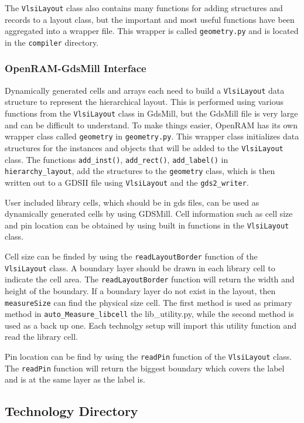 The \verb|VlsiLayout| class also contains many functions for adding
structures and records to a layout class, but the important and most
useful functions have been aggregated into a wrapper file.  This
wrapper is called \verb|geometry.py| and is located in the
\verb|compiler| directory.

\subsubsection{OpenRAM-GdsMill Interface}
\label{sec:wrapper}

Dynamically generated cells and arrays each need to build a
\verb|VlsiLayout| data structure to represent the hierarchical layout.
This is performed using various functions from the \verb|VlsiLayout|
class in GdsMill, but the GdsMill file is very large and can be
difficult to understand.  To make things easier, OpenRAM has its own
wrapper class called \verb|geometry| in \verb|geometry.py|.  This
wrapper class initializes data structures for the
instances and objects that will be added to the \verb|VlsiLayout|
class.  The functions \verb|add_inst()|, \verb|add_rect()|,
\verb|add_label()| in \verb|hierarchy_layout|, add the structures to
the \verb|geometry| class, which is then written out to a GDSII file
using \verb|VlsiLayout| and the \verb|gds2_writer|.

User included library cells, which should be in gds files, can be used
as dynamically generated cells by using GDSMill.
Cell information such as cell size and pin location can be obtained by using
built in functions in the \verb|VlsiLayout| class.

Cell size can be finded by using the \verb|readLayoutBorder| function of the \verb|VlsiLayout| class.
A boundary layer should be drawn in each library cell to indicate the cell area.
The \verb|readLayoutBorder| function will return the width and height of the boundary.
If a boundary layer do not exist in the layout, then \verb|measureSize| can find the physical 
size cell.
The first method is used as primary method in \verb|auto_Measure_libcell| the lib\_utility.py,
while the second method is used as a back up one.
Each technolgy setup will import this utility function and read the library cell.

Pin location can be find by using the \verb|readPin| function of the \verb|VlsiLayout| class.
The \verb|readPin| function will return the biggest boundary which covers the label and 
is at the same layer as the label is.


\subsection{Technology Directory}
\label{sec:techdir}


